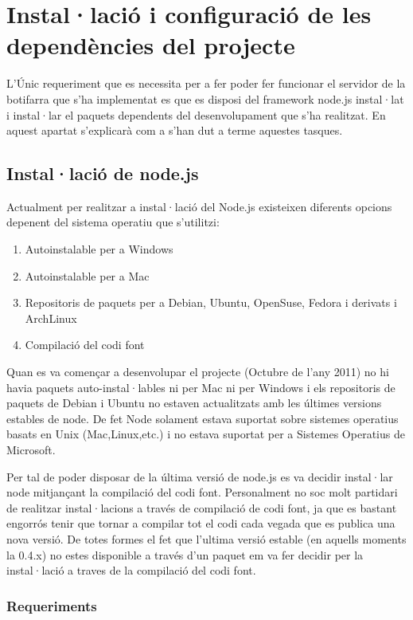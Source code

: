\chapter{Instal·lació i configuració de les dependències del projecte}
\label{chap:dependencies}


L'Únic requeriment que es necessita per a fer poder fer funcionar el servidor de la botifarra que s'ha implementat es que es disposi del framework node.js instal·lat i instal·lar el paquets dependents del desenvolupament que s'ha realitzat. En aquest apartat s'explicarà com a s'han dut a terme aquestes tasques. 

\section{Instal·lació de node.js}
\label{sec:instalacio-node}
Actualment per realitzar a instal·lació del Node.js existeixen diferents opcions depenent del sistema operatiu que s'utilitzi: 

\begin{enumerate}
    \item{Autoinstalable per a Windows}
    \item{Autoinstalable per a Mac}
    \item{Repositoris de paquets per a Debian, Ubuntu, OpenSuse, Fedora i derivats i ArchLinux}
    \item{Compilació del codi font}
\end{enumerate}

Quan es va començar a desenvolupar el projecte (Octubre de l'any 2011) no hi havia paquets auto-instal·lables ni per Mac ni per Windows i els repositoris de paquets de Debian i Ubuntu no estaven actualitzats amb les últimes versions estables de node. De fet Node solament estava suportat sobre sistemes operatius basats en Unix (Mac,Linux,etc.) i no estava suportat per a Sistemes Operatius de Microsoft. 

Per tal de poder disposar de la última versió de node.js es va decidir instal·lar node mitjançant la compilació del codi font. Personalment no soc molt partidari de realitzar instal·lacions a través de compilació de codi font, ja que es bastant engorrós tenir que tornar a compilar tot el codi cada vegada que es publica una nova versió. De totes formes el fet que l'ultima versió estable (en aquells moments la 0.4.x) no estes disponible a través d'un paquet em va fer decidir per la instal·lació a traves de la compilació del codi font. 

\subsection{Requeriments}


